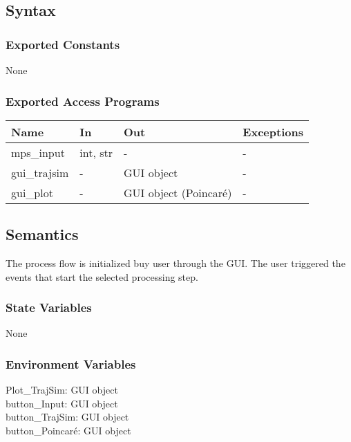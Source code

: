 \documentclass[12pt, titlepage]{article}
\begin{document}
\subsection{Syntax}

\subsubsection{Exported Constants}

None

\subsubsection{Exported Access Programs}

\begin{center}
\begin{tabular}{p{2cm} p{4cm} p{4cm} p{2cm}}
\hline
\textbf{Name} & \textbf{In} & \textbf{Out} & \textbf{Exceptions} \\
\hline
mps\_input & int, str & - & - \\
gui\_trajsim & - & GUI object & - \\
gui\_plot & - & GUI object (Poincar\'{e}) & - \\
\hline
\end{tabular}
\end{center}

\subsection{Semantics}

The \progname process flow is initialized buy user through the GUI. 
The user triggered the events that start the selected processing step.

\subsubsection{State Variables}

None

\subsubsection{Environment Variables}

\noindent Plot{\_}TrajSim: GUI object\\
button{\_}Input: GUI object\\
button{\_}TrajSim: GUI object\\
button{\_}Poincar\'{e}: GUI object\\
\end{document}
